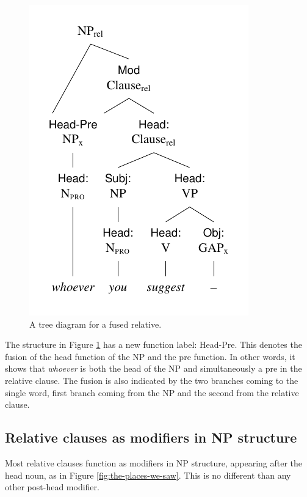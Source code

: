 \begin{figure}[ht]
    \centering
    \includegraphics{figures/whoever-you-suggest.pdf}
    \caption{A tree diagram for a fused relative.}
    \label{fig:whoever-you-suggest}
\end{figure}

The structure in Figure \ref{fig:whoever-you-suggest} has a new function label: \textsf{Head-Pre}. This denotes the fusion of the head function of the NP and the pre function. In other words, it shows that \textit{whoever} is both the head of the NP and simultaneously a pre in the relative clause. The fusion is also indicated by the two branches coming to the single word, first branch coming from the NP and the second from the relative clause.

\subsection{Relative clauses as modifiers in NP structure}

Most relative clauses function as modifiers in NP structure, appearing after the head noun, as in Figure \ref{fig:the-places-we-saw}. This is no different than any other post-head modifier.

